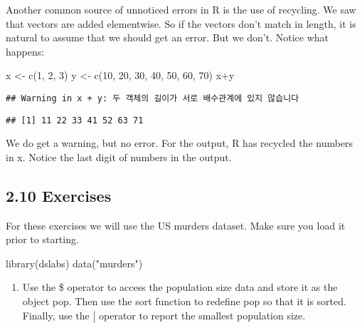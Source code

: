 \documentclass[
]{article}
\newenvironment{Shaded}{\begin{snugshade}}{\end{snugshade}}
\newcommand{\DecValTok}[1]{\textcolor[rgb]{0.00,0.00,0.81}{#1}}
\newcommand{\FunctionTok}[1]{\textcolor[rgb]{0.00,0.00,0.00}{#1}}
\newcommand{\NormalTok}[1]{#1}
\newcommand{\OtherTok}[1]{\textcolor[rgb]{0.56,0.35,0.01}{#1}}
\newcommand{\SpecialCharTok}[1]{\textcolor[rgb]{0.00,0.00,0.00}{#1}}
\newcommand{\StringTok}[1]{\textcolor[rgb]{0.31,0.60,0.02}{#1}}
\providecommand{\tightlist}{%
  \setlength{\itemsep}{0pt}\setlength{\parskip}{0pt}}
\begin{document}
Another common source of unnoticed errors in R is the use of recycling.
We saw that vectors are added elementwise. So if the vectors don't match
in length, it is natural to assume that we should get an error. But we
don't. Notice what happens:

\begin{Shaded}
\begin{Highlighting}[]
\NormalTok{x }\OtherTok{\textless{}{-}} \FunctionTok{c}\NormalTok{(}\DecValTok{1}\NormalTok{, }\DecValTok{2}\NormalTok{, }\DecValTok{3}\NormalTok{)}
\NormalTok{y }\OtherTok{\textless{}{-}} \FunctionTok{c}\NormalTok{(}\DecValTok{10}\NormalTok{, }\DecValTok{20}\NormalTok{, }\DecValTok{30}\NormalTok{, }\DecValTok{40}\NormalTok{, }\DecValTok{50}\NormalTok{, }\DecValTok{60}\NormalTok{, }\DecValTok{70}\NormalTok{)}
\NormalTok{x}\SpecialCharTok{+}\NormalTok{y}
\end{Highlighting}
\end{Shaded}

\begin{verbatim}
## Warning in x + y: 두 객체의 길이가 서로 배수관계에 있지 않습니다
\end{verbatim}

\begin{verbatim}
## [1] 11 22 33 41 52 63 71
\end{verbatim}

We do get a warning, but no error. For the output, R has recycled the
numbers in x. Notice the last digit of numbers in the output.

\hypertarget{exercises-3}{%
\subsection{2.10 Exercises}\label{exercises-3}}

For these exercises we will use the US murders dataset. Make sure you
load it prior to starting.

\begin{Shaded}
\begin{Highlighting}[]
\FunctionTok{library}\NormalTok{(dslabs)}
\FunctionTok{data}\NormalTok{(}\StringTok{"murders"}\NormalTok{)}
\end{Highlighting}
\end{Shaded}

\begin{enumerate}
\def\labelenumi{\arabic{enumi}.}
\tightlist
\item
  Use the \$ operator to access the population size data and store it as
  the object pop. Then use the sort function to redefine pop so that it
  is sorted. Finally, use the {[} operator to report the smallest
  population size.
\end{enumerate}
\end{document}
